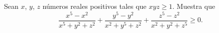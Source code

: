 Sean $x$, $y$, $z$ números reales positivos tales que $xyz\geq 1$. Muestra que
\[ \frac { x^5-x^2 }{x^5+y^2+z^2} + \frac {y^5-y^2}{x^2+y^5+z^2} + \frac {z^5-z^2}{x^2+y^2+z^5} \geq 0 . \]